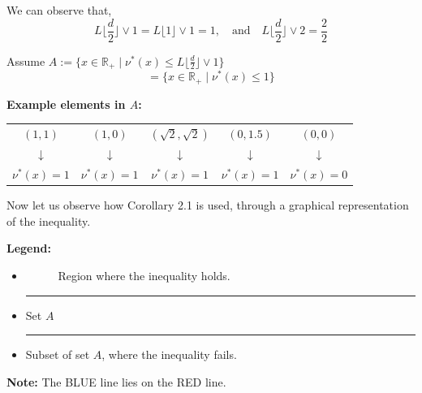 \documentclass[12pt]{article}
\theoremstyle{definition}
\begin{document}
We can observe that,
\[
L\lfloor \frac{d}{2} \rfloor \vee 1 = L\lfloor 1 \rfloor \vee 1 = 1, \quad \text{and} \quad L\lfloor \frac{d}{2} \rfloor \vee 2 = \frac{2}{2}
\]

Assume $A := \{x \in \mathbb{R}_+ \mid \nu^*(x) \leq L\lfloor \frac{d}{2} \rfloor \vee 1\}$
\[
= \{x \in \mathbb{R}_+ \mid \nu^*(x) \leq 1\}
\]

\textbf{Example elements in $A$:}
\begin{center}
\begin{tabular}{ccccc}
$(1,1)$ & $(1,0)$ & $(\sqrt{2}, \sqrt{2})$ & $(0, 1.5)$ & $(0,0)$ \\
$\downarrow$ & $\downarrow$ & $\downarrow$ & $\downarrow$ & $\downarrow$ \\
$\nu^*(x) = 1$ & $\nu^*(x) = 1$ & $\nu^*(x) = 1$ & $\nu^*(x) = 1$ & $\nu^*(x) = 0$
\end{tabular}
\end{center}

Now let us observe how Corollary 2.1 is used, through a graphical representation of the inequality.

\textbf{Legend:}
\begin{itemize}
\item \colorbox{green!50}{\ \ \ \ \ } Region where the inequality holds.
\item {\color{red}\rule{1cm}{2pt}} Set $A$
\item {\color{blue}\rule{1cm}{2pt}} Subset of set $A$, where the inequality fails.
\end{itemize}

\textbf{Note:} The {\color{blue}BLUE} line lies on the {\color{red}RED} line.
\end{document}
